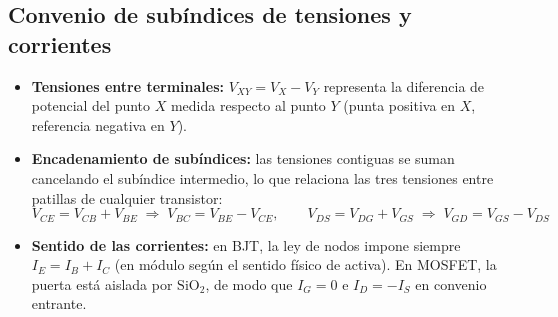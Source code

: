 \documentclass[11pt,a4paper]{article}
\begin{document}
	\subsection{Convenio de subíndices de tensiones y corrientes}

	\begin{itemize}
		\item \textbf{Tensiones entre terminales:} $V_{XY} = V_X - V_Y$ representa la diferencia de potencial del punto $X$ medida respecto al punto $Y$ (punta positiva en $X$, referencia negativa en $Y$).
		\item \textbf{Encadenamiento de subíndices:} las tensiones contiguas se suman cancelando el subíndice intermedio, lo que relaciona las tres tensiones entre patillas de cualquier transistor:
		\[
		V_{CE} = V_{CB} + V_{BE} \;\Longrightarrow\; V_{BC} = V_{BE} - V_{CE},
		\qquad
		V_{DS} = V_{DG} + V_{GS} \;\Longrightarrow\; V_{GD} = V_{GS} - V_{DS}
		\]
		\item \textbf{Sentido de las corrientes:} en BJT, la ley de nodos impone siempre $I_E = I_B + I_C$ (en módulo según el sentido físico de activa). En MOSFET, la puerta está aislada por $\mathrm{SiO}_2$, de modo que $I_G = 0$ e $I_D = -I_S$ en convenio entrante.
	\end{itemize}
\end{document}

